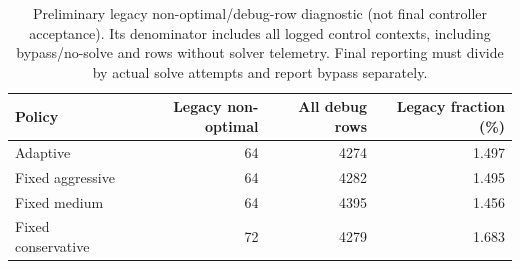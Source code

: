 \begin{table}[t]
\centering\small
\caption{Preliminary legacy non-optimal/debug-row diagnostic (not final controller acceptance). Its denominator includes all logged control contexts, including bypass/no-solve and rows without solver telemetry. Final reporting must divide by actual solve attempts and report bypass separately.}
\label{tab:supervisor-feedback-solver-nonoptimal}
\begin{tabular}{@{}lrrr@{}}
\toprule
Policy & Legacy non-optimal & All debug rows & Legacy fraction (\%) \\
\midrule
Adaptive & 64 & 4274 & 1.497 \\
Fixed aggressive & 64 & 4282 & 1.495 \\
Fixed medium & 64 & 4395 & 1.456 \\
Fixed conservative & 72 & 4279 & 1.683 \\
\bottomrule
\end{tabular}
\end{table}
